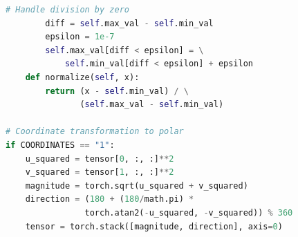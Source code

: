 \documentclass[footline=authortitle]{beamer}
\begin{document}
\begin{frame}[fragile]
\begin{columns}
\begin{column}{0.6\textwidth}
\begin{lstlisting}[language=Python, basicstyle=\ttfamily\tiny]
        # Handle division by zero
        diff = self.max_val - self.min_val
        epsilon = 1e-7
        self.max_val[diff < epsilon] = \
            self.min_val[diff < epsilon] + epsilon
    def normalize(self, x):
        return (x - self.min_val) / \
               (self.max_val - self.min_val)

# Coordinate transformation to polar
if COORDINATES == "1":
    u_squared = tensor[0, :, :]**2
    v_squared = tensor[1, :, :]**2
    magnitude = torch.sqrt(u_squared + v_squared)
    direction = (180 + (180/math.pi) * 
                torch.atan2(-u_squared, -v_squared)) % 360
    tensor = torch.stack([magnitude, direction], axis=0)
\end{lstlisting}
\end{column}
\end{columns}

\end{frame}



\end{document}
